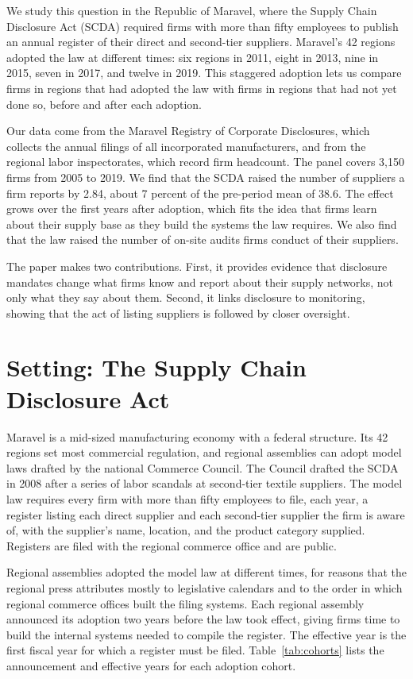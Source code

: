 \documentclass[11pt]{article}
\begin{document}
We study this question in the Republic of Maravel, where the Supply Chain Disclosure Act (SCDA) required firms with more than fifty employees to publish an annual register of their direct and second-tier suppliers. Maravel's 42 regions adopted the law at different times: six regions in 2011, eight in 2013, nine in 2015, seven in 2017, and twelve in 2019. This staggered adoption lets us compare firms in regions that had adopted the law with firms in regions that had not yet done so, before and after each adoption.

Our data come from the Maravel Registry of Corporate Disclosures, which collects the annual filings of all incorporated manufacturers, and from the regional labor inspectorates, which record firm headcount. The panel covers 3,150 firms from 2005 to 2019. We find that the SCDA raised the number of suppliers a firm reports by 2.84, about 7 percent of the pre-period mean of 38.6. The effect grows over the first years after adoption, which fits the idea that firms learn about their supply base as they build the systems the law requires. We also find that the law raised the number of on-site audits firms conduct of their suppliers.

The paper makes two contributions. First, it provides evidence that disclosure mandates change what firms know and report about their supply networks, not only what they say about them. Second, it links disclosure to monitoring, showing that the act of listing suppliers is followed by closer oversight.

\section{Setting: The Supply Chain Disclosure Act}

Maravel is a mid-sized manufacturing economy with a federal structure. Its 42 regions set most commercial regulation, and regional assemblies can adopt model laws drafted by the national Commerce Council. The Council drafted the SCDA in 2008 after a series of labor scandals at second-tier textile suppliers. The model law requires every firm with more than fifty employees to file, each year, a register listing each direct supplier and each second-tier supplier the firm is aware of, with the supplier's name, location, and the product category supplied. Registers are filed with the regional commerce office and are public.

Regional assemblies adopted the model law at different times, for reasons that the regional press attributes mostly to legislative calendars and to the order in which regional commerce offices built the filing systems. Each regional assembly announced its adoption two years before the law took effect, giving firms time to build the internal systems needed to compile the register. The effective year is the first fiscal year for which a register must be filed. Table~\ref{tab:cohorts} lists the announcement and effective years for each adoption cohort.
\end{document}
